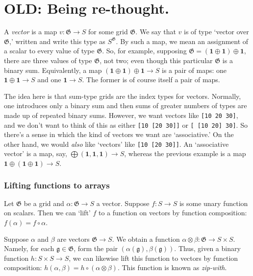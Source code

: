 \documentclass[11pt]{article}
\newcommand{\gr}[1]{\mathfrak{#1}}
\newcommand{\GG}{\gr{G}}
\newcommand{\unit}{\mathbf{1}}
\begin{document}
\section{OLD: Being re-thought.}
\label{sec:org0f361a3}


A \emph{vector} is a map \(v : \GG\to S\) for some grid \(\GG\). We say that \(v\) is of
type ‘vector over \(\GG\),’ written and write this type as \(S^\GG\). By such a map,
we mean an assignment of a scalar to every value of type \(\GG\). So, for example,
supposing \(\GG = (\unit\oplus\unit) \oplus \unit\), there are three values of
type \(\GG\), not two; even though this particular \(\GG\) is a binary
sum. Equivalently, a map \((\unit\oplus\unit) \oplus \unit\to S\) is a pair of
maps: one \(\unit\oplus\unit\to S\) and one \(\unit\to S\). The former is of course
itself a pair of maps.

The idea here is that sum-type grids are the index types for vectors. Normally,
one introduces only a binary sum and then sums of greater numbers of types are
made up of repeated binary sums. However, we want vectors like \texttt{[10 20 30]}, and
we don't want to think of this as either \texttt{[10 [20 30]]} or \texttt{[ [10 20] 30]}.  So
there's a sense in which the kind of vectors we want are ‘associative.’ On the
other hand, we would \emph{also} like ‘vectors’ like \texttt{[10 [20 30]]}. An ‘associative
vector’ is a map, say, \(\bigoplus(\unit, \unit, \unit)\to S\), whereas the
previous example is a map \(\unit\oplus (\unit\oplus \unit)\to S\).

\subsubsection{Lifting functions to arrays}
\label{sec:orgc0391ab}

Let \(\GG\) be a grid and \(\alpha:\GG\to S\) a vector. Suppose \(f:S\to S\) is some
unary function on scalars. Then we can ‘lift’ \(f\) to a function on vectors by
function composition: \(f(\alpha) = f\circ\alpha\).

Suppose \(\alpha\) and \(\beta\) are vectors \(\GG\to S\). We obtain a function
\(\alpha\otimes\beta : \GG\to S\times S\). Namely, for each \(\mathfrak{g}\in \GG\),
form the pair \((\alpha(\mathfrak{g}), \beta(\mathfrak{g}))\). Thus, given a
binary function \(h : S\times S\to S\), we can likewise lift this function to
vectors by function composition: \(h(\alpha, \beta) = h\circ
(\alpha\otimes\beta)\). This function is known as \emph{zip-with}.
\end{document}
